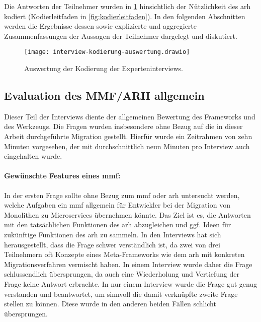 Die Antworten der Teilnehmer wurden in \cref{fig:auswertung-interviews-kodierung} hinsichtlich der Nützlichkeit des \gls{arh} kodiert (Kodierleitfaden in \cref{fig:kodierleitfaden}).
In den folgenden Abschnitten werden die Ergebnisse dessen sowie explizierte und aggregierte Zusammenfassungen der Aussagen der Teilnehmer dar\-ge\-legt und diskutiert.

\begin{figure}%
	\centering
	\texttt{[image: interview-kodierung-auswertung.drawio]}
	\caption[Auswertung Kodierung Experteninterviews]{
		Auswertung der Kodierung der Experteninterviews.
	}
	\label{fig:auswertung-interviews-kodierung}
\end{figure}


\subsection{Evaluation des MMF/ARH allgemein}
\label{sec:evaluation-mmf-allgemein}

Dieser Teil der Interviews diente der allgemeinen Bewertung des Frameworks und des Werkzeugs.
Die Fragen wurden insbesondere ohne Bezug auf die in dieser Arbeit durchgeführte Migration gestellt.
Hierfür wurde ein Zeitrahmen von zehn Minuten vorgesehen, der mit durchschnittlich neun Minuten pro Interview auch eingehalten wurde.

\paragraph{Gewünschte Features eines \gls{mmf}:} In der ersten Frage sollte ohne Bezug zum \gls{mmf} oder \gls{arh} untersucht werden, welche Aufgaben ein \acrlong{mmf} allgemein für Entwickler bei der Migration von Monolithen zu Microservices übernehmen könnte.
Das Ziel ist es, die Antworten mit den tatsächlichen Funktionen des \gls{arh} abzugleichen und ggf. Ideen für zukünftige Funktionen des \gls{arh} zu sammeln.
In den Interviews hat sich herausgestellt, dass die Frage schwer verständlich ist, da zwei von drei Teilnehmern oft Konzepte eines Meta-Frameworks wie dem \gls{arh} mit konkreten Migrationsverfahren vermischt haben.
In einem Interview wurde daher die Frage schlussendlich übersprungen, da auch eine Wiederholung und Vertiefung der Frage keine Antwort erbrachte.
In nur einem Interview wurde die Frage gut genug verstanden und beantwortet, um sinnvoll die damit verknüpfte zweite Frage stellen zu können.
Diese wurde in den anderen beiden Fällen schlicht übersprungen.

